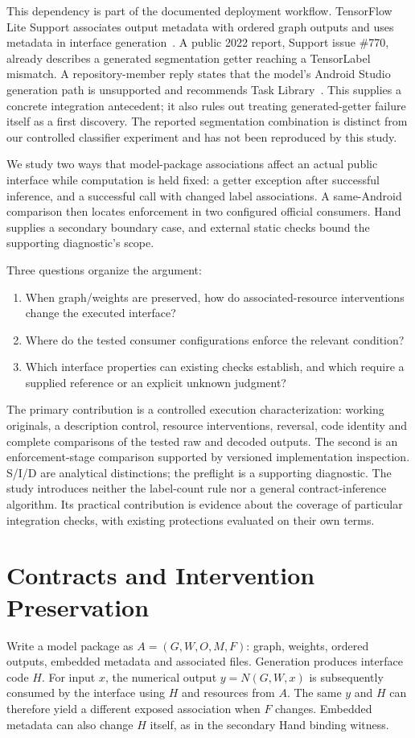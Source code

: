 \documentclass[10pt,twocolumn,letterpaper]{article}
\begin{document}
This dependency is part of the documented deployment workflow. TensorFlow Lite Support associates output metadata with ordered graph outputs and uses metadata in interface generation~\cite{schema,codegen-doc}. A public 2022 report, Support issue \#770, already describes a generated segmentation getter reaching a TensorLabel mismatch. A repository-member reply states that the model's Android Studio generation path is unsupported and recommends Task Library~\cite{support770,support770reply}. This supplies a concrete integration antecedent; it also rules out treating generated-getter failure itself as a first discovery. The reported segmentation combination is distinct from our controlled classifier experiment and has not been reproduced by this study.

We study two ways that model-package associations affect an actual public interface while computation is held fixed: a getter exception after successful inference, and a successful call with changed label associations. A same-Android comparison then locates enforcement in two configured official consumers. Hand supplies a secondary boundary case, and external static checks bound the supporting diagnostic's scope.

Three questions organize the argument:
\begin{enumerate}
\item When graph/weights are preserved, how do associated-resource interventions change the executed interface?
\item Where do the tested consumer configurations enforce the relevant condition?
\item Which interface properties can existing checks establish, and which require a supplied reference or an explicit unknown judgment?
\end{enumerate}

The primary contribution is a controlled execution characterization: working originals, a description control, resource interventions, reversal, code identity and complete comparisons of the tested raw and decoded outputs. The second is an enforcement-stage comparison supported by versioned implementation inspection. S/I/D are analytical distinctions; the preflight is a supporting diagnostic. The study introduces neither the label-count rule nor a general contract-inference algorithm. Its practical contribution is evidence about the coverage of particular integration checks, with existing protections evaluated on their own terms.

\section{Contracts and Intervention Preservation}
\label{sec:contracts}
Write a model package as $A=(G,W,O,M,F)$: graph, weights, ordered outputs, embedded metadata and associated files. Generation produces interface code $H$. For input $x$, the numerical output $y=N(G,W,x)$ is subsequently consumed by the interface using $H$ and resources from $A$. The same $y$ and $H$ can therefore yield a different exposed association when $F$ changes. Embedded metadata can also change $H$ itself, as in the secondary Hand binding witness.
\end{document}
